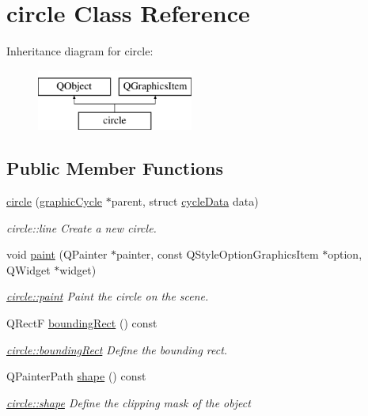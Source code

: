 \hypertarget{classcircle}{}\section{circle Class Reference}
\label{classcircle}
Inheritance diagram for circle\+:\begin{figure}[H]
\begin{center}
\leavevmode
\includegraphics[height=2.000000cm]{classcircle}
\end{center}
\end{figure}
\subsection*{Public Member Functions}
\begin{DoxyCompactItemize}
\item 
\mbox{\hyperlink{classcircle_abfd721dc65145023cf14739adacc81a8}{circle}} (\mbox{\hyperlink{classgraphic_cycle}{graphic\+Cycle}} $\ast$parent, struct \mbox{\hyperlink{structcycle_data}{cycle\+Data}} data)
\begin{DoxyCompactList}\small\item\em circle\+::line Create a new circle. \end{DoxyCompactList}\item 
void \mbox{\hyperlink{classcircle_a2d9af8e86fb3605c736689a2e2566d26}{paint}} (Q\+Painter $\ast$painter, const Q\+Style\+Option\+Graphics\+Item $\ast$option, Q\+Widget $\ast$widget)
\begin{DoxyCompactList}\small\item\em \mbox{\hyperlink{classcircle_a2d9af8e86fb3605c736689a2e2566d26}{circle\+::paint}} Paint the circle on the scene. \end{DoxyCompactList}\item 
Q\+RectF \mbox{\hyperlink{classcircle_ab9d2059829ac8f0420c7e711caeb61c7}{bounding\+Rect}} () const
\begin{DoxyCompactList}\small\item\em \mbox{\hyperlink{classcircle_ab9d2059829ac8f0420c7e711caeb61c7}{circle\+::bounding\+Rect}} Define the bounding rect. \end{DoxyCompactList}\item 
Q\+Painter\+Path \mbox{\hyperlink{classcircle_a198cbcea745bd311fe91c2a23def746c}{shape}} () const
\begin{DoxyCompactList}\small\item\em \mbox{\hyperlink{classcircle_a198cbcea745bd311fe91c2a23def746c}{circle\+::shape}} Define the clipping mask of the object \end{DoxyCompactList}\end{DoxyCompactItemize}


